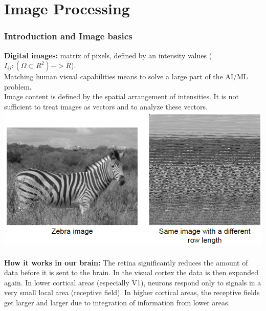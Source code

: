 \documentclass{article}
\begin{document}
\part{Image Processing}
\newpage

\section{Introduction and Image basics}

\textbf{Digital images: }matrix of pixels, defined by an intensity values ($I_{ij}: (\Omega \subset R^2)-> R$).\\

Matching human visual capabilities means to solve a large part of the AI/ML problem.\\
Image content is defined by the spatial arrangement of intensities. It is not sufficient to treat images as vectors and to analyze these vectors.\\
\includegraphics[scale=0.7]{11.png}\\\\
\textbf{How it works in our brain: }The retina significantly reduces the amount of data before it is sent to the brain. In the visual cortex the data is then expanded again. In lower cortical areas (especially V1), neurons respond only to signals in a very small local area (receptive field). In higher cortical areas, the receptive fields get larger and larger due to integration of information from lower areas. \\
\end{document}
